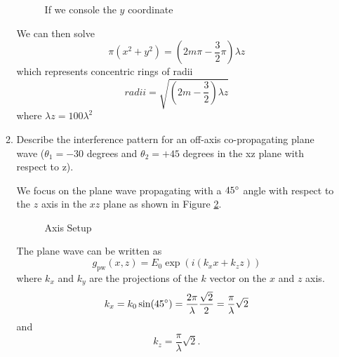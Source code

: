 \documentclass[main.tex]{subfiles}
\begin{document}
\begin{enumerate}
\begin{enumerate}
\begin{figure}
\centering{}
\caption{If we console the $y$ coordinate}
\label{fig:51a02}
\end{figure}

We can then solve 
$$\pi (x^2 + y^2) = (2m\pi - \frac{3}{2}\pi)\lambda z$$
which represents concentric rings of radii
$$radii = \sqrt{(2m - \frac{3}{2}) \lambda z}$$
where $\lambda z = 100 \lambda^2$

\item{Describe the interference pattern for an off-axis co-propagating plane wave ($\theta_1 = -30$ degrees and $\theta_2 = +45$ degrees in the xz plane with respect to z).}

We focus on the plane wave propagating with a $45\degree$ angle with respect to the $z$ axis in the $xz$ plane as shown in Figure \ref{fig:hw51b01}.

\begin{figure}
\centering{}
\caption{Axis Setup}
\label{fig:hw51b01}
\end{figure}

The plane wave can be written as 
$$g_{\mathrm{pw}}(x,z) = E_0 \exp \left(i (k_x x + k_z z) \right)$$
where $k_x$ and $k_y$ are the projections of the $k$ vector on the $x$ and $z$ axis.
$$k_x = k_0 \sin (45 \degree) = \frac{2 \pi}{\lambda} \frac{\sqrt{2}}{2} = \frac{\pi}{\lambda}\sqrt{2}$$
and
$$k_z = \frac{\pi}{\lambda}\sqrt{2}.$$


\end{enumerate}
\end{enumerate}
\end{document}
